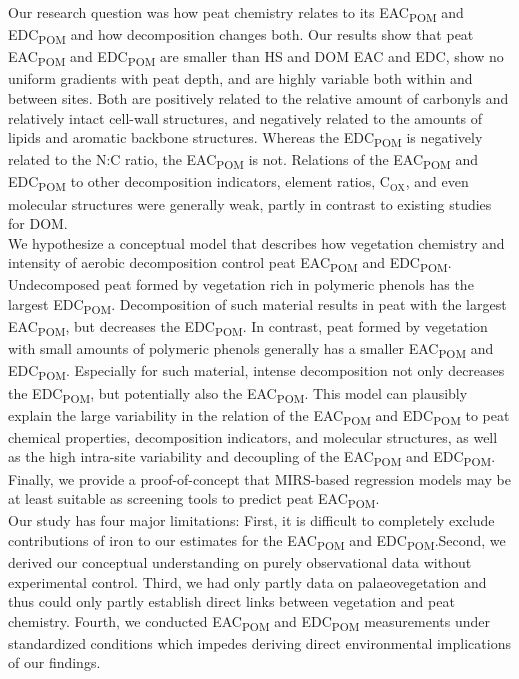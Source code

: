 \documentclass[alpha-refs]{wiley-article-rmd}
\begin{document}
\begin{refsection}
Our research question was how peat chemistry relates to its EAC\textsubscript{POM} and EDC\textsubscript{POM} and how decomposition changes both. Our results show that peat EAC\textsubscript{POM} and EDC\textsubscript{POM} are smaller than HS and DOM EAC and EDC, show no uniform gradients with peat depth, and are highly variable both within and between sites. Both are positively related to the relative amount of carbonyls and relatively intact cell-wall structures, and negatively related to the amounts of lipids and aromatic backbone structures. Whereas the EDC\textsubscript{POM} is negatively related to the N:C ratio, the EAC\textsubscript{POM} is not. Relations of the EAC\textsubscript{POM} and EDC\textsubscript{POM} to other decomposition indicators, element ratios, C\(_\text{OX}\), and even molecular structures were generally weak, partly in contrast to existing studies for DOM.\\
We hypothesize a conceptual model that describes how vegetation chemistry and intensity of aerobic decomposition control peat EAC\textsubscript{POM} and EDC\textsubscript{POM}. Undecomposed peat formed by vegetation rich in polymeric phenols has the largest EDC\textsubscript{POM}. Decomposition of such material results in peat with the largest EAC\textsubscript{POM}, but decreases the EDC\textsubscript{POM}. In contrast, peat formed by vegetation with small amounts of polymeric phenols generally has a smaller EAC\textsubscript{POM} and EDC\textsubscript{POM}. Especially for such material, intense decomposition not only decreases the EDC\textsubscript{POM}, but potentially also the EAC\textsubscript{POM}. This model can plausibly explain the large variability in the relation of the EAC\textsubscript{POM} and EDC\textsubscript{POM} to peat chemical properties, decomposition indicators, and molecular structures, as well as the high intra-site variability and decoupling of the EAC\textsubscript{POM} and EDC\textsubscript{POM}.
Finally, we provide a proof-of-concept that MIRS-based regression models may be at least suitable as screening tools to predict peat EAC\textsubscript{POM}.\\
Our study has four major limitations: First, it is difficult to completely exclude contributions of iron to our estimates for the EAC\textsubscript{POM} and EDC\textsubscript{POM}.Second, we derived our conceptual understanding on purely observational data without experimental control. Third, we had only partly data on palaeovegetation and thus could only partly establish direct links between vegetation and peat chemistry. Fourth, we conducted EAC\textsubscript{POM} and EDC\textsubscript{POM} measurements under standardized conditions which impedes deriving direct environmental implications of our findings.\\

\end{refsection}
\end{document}
